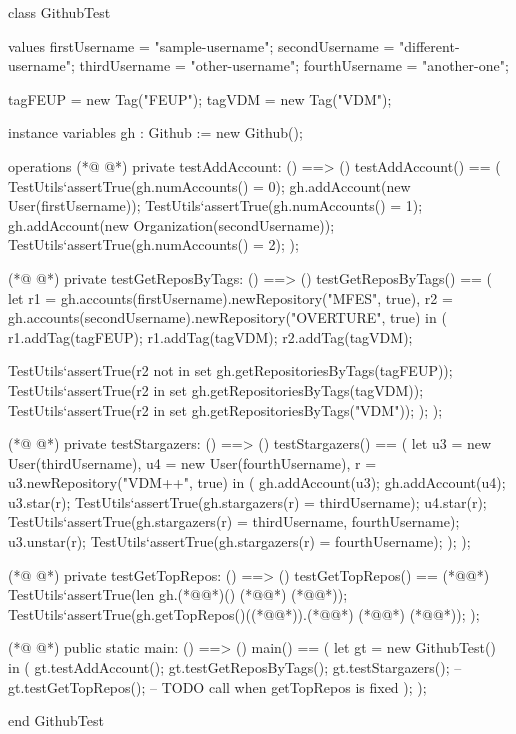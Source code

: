 \begin{vdmpp}[breaklines=true]
class GithubTest
 
 values
  firstUsername = "sample-username";
  secondUsername = "different-username";
  thirdUsername = "other-username";
  fourthUsername = "another-one";
  
  tagFEUP = new Tag("FEUP");
  tagVDM = new Tag("VDM");

 instance variables
  gh : Github := new Github();
  
 operations
(*@
\label{testAddAccount:16}
@*)
  private testAddAccount: () ==> ()
  testAddAccount() ==
  (
   TestUtils`assertTrue(gh.numAccounts() = 0);
   gh.addAccount(new User(firstUsername));
   TestUtils`assertTrue(gh.numAccounts() = 1);
   gh.addAccount(new Organization(secondUsername));
   TestUtils`assertTrue(gh.numAccounts() = 2);
  );

(*@
\label{testGetReposByTags:26}
@*)
  private testGetReposByTags: () ==> ()
  testGetReposByTags() ==
  (
   let r1 = gh.accounts(firstUsername).newRepository("MFES", true),
     r2 = gh.accounts(secondUsername).newRepository("OVERTURE", true) in (
    r1.addTag(tagFEUP);
    r1.addTag(tagVDM);
    r2.addTag(tagVDM);
    
    TestUtils`assertTrue(r2 not in set gh.getRepositoriesByTags({tagFEUP}));
    TestUtils`assertTrue(r2 in set gh.getRepositoriesByTags({tagVDM}));
    TestUtils`assertTrue(r2 in set gh.getRepositoriesByTags({"VDM"}));
   );
  );
  
(*@
\label{testStargazers:41}
@*)
  private testStargazers: () ==> () 
  testStargazers() == 
  (
   let u3 = new User(thirdUsername), u4 = new User(fourthUsername), r = u3.newRepository("VDM++", true) in (
    gh.addAccount(u3); gh.addAccount(u4);
    u3.star(r);
    TestUtils`assertTrue(gh.stargazers(r) = {thirdUsername});
    u4.star(r);
    TestUtils`assertTrue(gh.stargazers(r) = {thirdUsername, fourthUsername});
    u3.unstar(r);
    TestUtils`assertTrue(gh.stargazers(r) = {fourthUsername});
   );
  );
  
(*@
\label{testGetTopRepos:55}
@*)
  private testGetTopRepos: () ==> ()
  testGetTopRepos() == (*@\vdmnotcovered{(}@*)
   TestUtils`assertTrue(len gh.(*@@*)() (*@\vdmnotcovered{=}@*) (*@@*));
   TestUtils`assertTrue(gh.getTopRepos()((*@@*)).(*@@*) (*@\vdmnotcovered{=}@*) (*@@*));
  );
 
(*@
\label{main:61}
@*)
  public static main: () ==> ()
  main() ==
  (
   let gt = new GithubTest() in (
    gt.testAddAccount();
    gt.testGetReposByTags();
    gt.testStargazers();
--    gt.testGetTopRepos(); -- TODO call when getTopRepos is fixed
   );
  );


end GithubTest
\end{vdmpp}
